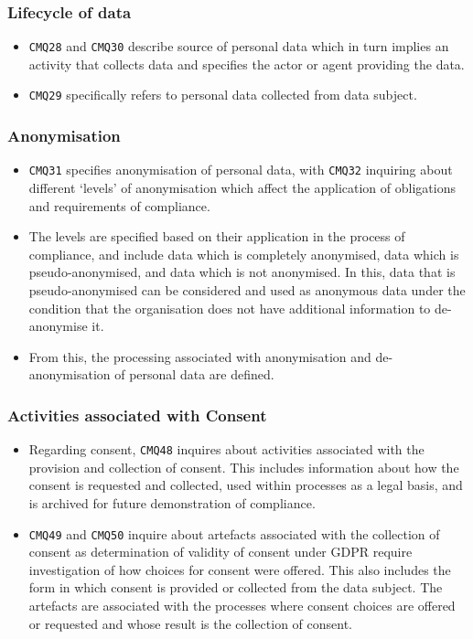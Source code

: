 \subsubsection{Lifecycle of data}
\begin{itemize}
    \item \texttt{CMQ28} and \texttt{CMQ30} describe source of personal data which in turn implies an activity that collects data and specifies the actor or agent providing the data.
    \item \texttt{CMQ29} specifically refers to personal data collected from data subject.
\end{itemize}

\subsubsection{Anonymisation}
\begin{itemize}
    \item \texttt{CMQ31} specifies anonymisation of personal data, with \texttt{CMQ32} inquiring about different `levels' of anonymisation which affect the application of obligations and requirements of compliance. 
    \item The levels are specified based on their application in the process of compliance, and include data which is completely anonymised, data which is pseudo-anonymised, and data which is not anonymised. In this, data that is pseudo-anonymised can be considered and used as anonymous data under the condition that the organisation does not have additional information to de-anonymise it. 
    \item From this, the processing associated with anonymisation and de-anonymisation of personal data are defined.
\end{itemize}

\subsubsection{Activities associated with Consent}
\begin{itemize}
    \item Regarding consent, \texttt{CMQ48} inquires about activities associated with the provision and collection of consent. This includes information about how the consent is requested and collected, used within processes as a legal basis, and is archived for future demonstration of compliance.
    \item \texttt{CMQ49} and \texttt{CMQ50} inquire about artefacts associated with the collection of consent as determination of validity of consent under GDPR require investigation of how choices for consent were offered. This also includes the form in which consent is provided or collected from the data subject. The artefacts are associated with the processes where consent choices are offered or requested and whose result is the collection of consent.
\end{itemize}


